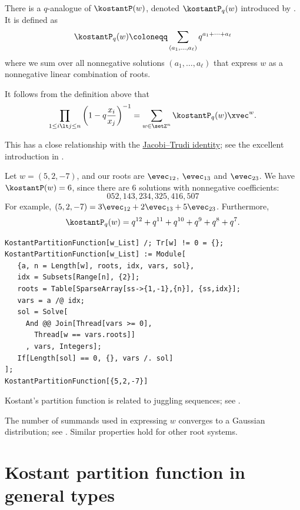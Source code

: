 There is a $q$-analogue of $\kostantP(w)$, denoted $\kostantP_q(w)$
introduced by  \cite{Lusztig1983}.  It is defined as
\[
\kostantP_q(w) \coloneqq \sum_{ (a_1,\dotsc,a_\ell) } q^{a_1+\dotsb +  a_\ell}
\]
where we sum over all nonnegative solutions $(a_1,\dotsc,a_\ell)$
that express $w$ as a nonnegative linear combination of roots.

It follows from the definition above that
\[
\prod_{1 \leq i \lt j \leq n} \left( 1 - q\frac{x_i}{x_j} \right)^{-1}
= \sum_{ w \in \setZ^n } \kostantP_q(w) \xvec^w.
\]


This has a close relationship with the
\hyperref[schurJacobiTrudi]{Jacobi--Trudi identity}; see the excellent
introduction in \cite{DesarmenienLeclercThibon1994}.


\begin{example}
Let $w=(5,2,-7)$, and our roots are $\evec_{12}$, $\evec_{13}$ and $\evec_{23}$.
We have $\kostantP(w) = 6$, since there are $6$ solutions with nonnegative
coefficients:
\[
052, 143, 234, 325, 416, 507
\]
For example, $(5,2,-7) = 3\evec_{12} + 2\evec_{13} + 5\evec_{23}$.
Furthermore,
\[
\kostantP_q(w) = q^{12}+q^{11}+q^{10}+q^9+q^8+q^7.
\]
\end{example}


\begin{lstlisting}
KostantPartitionFunction[w_List] /; Tr[w] != 0 = {};
KostantPartitionFunction[w_List] := Module[
   {a, n = Length[w], roots, idx, vars, sol},
   idx = Subsets[Range[n], {2}];
   roots = Table[SparseArray[ss->{1,-1},{n}], {ss,idx}];
   vars = a /@ idx;
   sol = Solve[
     And @@ Join[Thread[vars >= 0],
       Thread[w == vars.roots]]
     , vars, Integers];
   If[Length[sol] == 0, {}, vars /. sol]
];
KostantPartitionFunction[{5,2,-7}]
\end{lstlisting}


Kostant's partition function is related to juggling sequences;
see \cite{BenedettiHanusaHarrisMoralesSimpson2020}.

The number of summands used in expressing $w$ converges to a Gaussian
distribution; see \cite{HarrisRahmoellerSchneider2019x}.  Similar properties
hold for other root systems.



\section[kostantPartitionFunctionOtherTypes]{Kostant partition function in general types}

